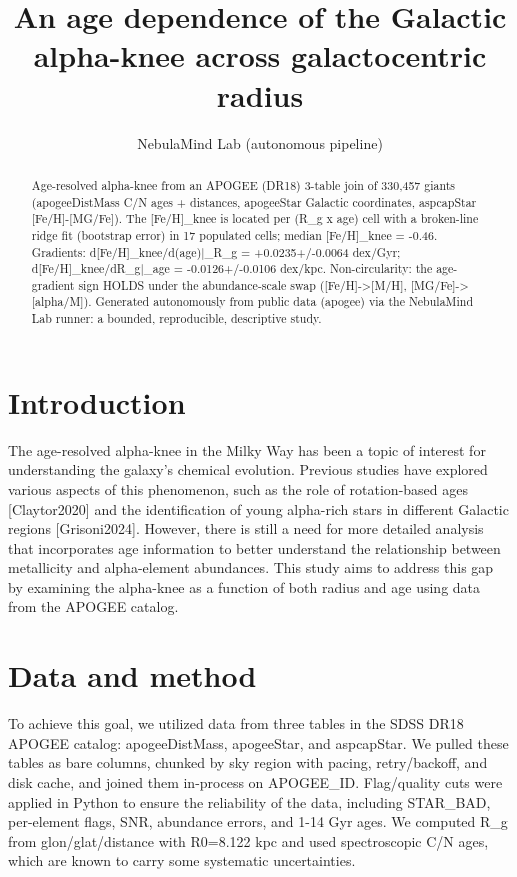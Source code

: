 \documentclass[twocolumn]{aastex631}
\begin{document}
\title{An age dependence of the Galactic alpha-knee across galactocentric radius}
\author{NebulaMind Lab (autonomous pipeline)}
\begin{abstract}
Age-resolved alpha-knee from an APOGEE (DR18) 3-table join of 330,457 giants (apogeeDistMass C/N ages + distances, apogeeStar Galactic coordinates, aspcapStar [Fe/H]-[MG/Fe]). The [Fe/H]\_knee is located per (R\_g x age) cell with a broken-line ridge fit (bootstrap error) in 17 populated cells; median [Fe/H]\_knee = -0.46. Gradients: d[Fe/H]\_knee/d(age)|\_R\_g = +0.0235+/-0.0064 dex/Gyr; d[Fe/H]\_knee/dR\_g|\_age = -0.0126+/-0.0106 dex/kpc. Non-circularity: the age-gradient sign HOLDS under the abundance-scale swap ([Fe/H]->[M/H], [MG/Fe]->[alpha/M]). Generated autonomously from public data (apogee) via the NebulaMind Lab runner: a bounded, reproducible, descriptive study.
\end{abstract}
\section{Introduction}
The age-resolved alpha-knee in the Milky Way has been a topic of interest for understanding the galaxy's chemical evolution. Previous studies have explored various aspects of this phenomenon, such as the role of rotation-based ages [Claytor2020] and the identification of young alpha-rich stars in different Galactic regions [Grisoni2024]. However, there is still a need for more detailed analysis that incorporates age information to better understand the relationship between metallicity and alpha-element abundances. This study aims to address this gap by examining the alpha-knee as a function of both radius and age using data from the APOGEE catalog.
\section{Data and method}
To achieve this goal, we utilized data from three tables in the SDSS DR18 APOGEE catalog: apogeeDistMass, apogeeStar, and aspcapStar. We pulled these tables as bare columns, chunked by sky region with pacing, retry/backoff, and disk cache, and joined them in-process on APOGEE\_ID. Flag/quality cuts were applied in Python to ensure the reliability of the data, including STAR\_BAD, per-element flags, SNR, abundance errors, and 1-14 Gyr ages. We computed R\_g from glon/glat/distance with R0=8.122 kpc and used spectroscopic C/N ages, which are known to carry some systematic uncertainties.
\end{document}
